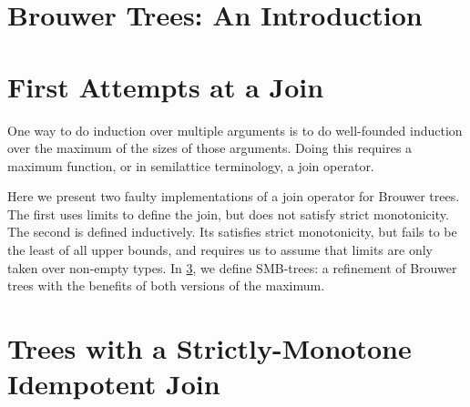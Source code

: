 



\section{Brouwer Trees: An Introduction}




\section{First Attempts at a Join}
\label{sec:join}
One way to do induction over multiple arguments is to do well-founded
induction over the maximum of the sizes of those arguments. Doing this requires
a maximum function, or in semilattice terminology, a join operator.

Here we present two faulty implementations of a join operator
for Brouwer trees. The first uses limits to define the join, but does not satisfy
strict monotonicity. The second is defined inductively. Its satisfies
strict monotonicity, but fails to be the least of all upper bounds,
and requires us to assume that limits are only taken over non-empty types.
In \cref{sec:strict}, we define SMB-trees: a refinement of Brouwer trees with
the benefits of both versions of the maximum.
  
  

  \section{Trees with a Strictly-Monotone Idempotent Join}
  \label{sec:strict}









